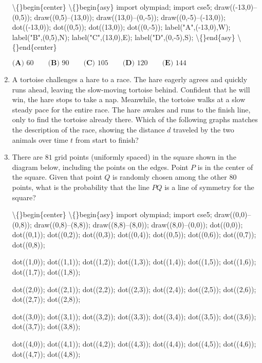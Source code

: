 \documentclass{article}
\begin{document}
\begin{enumerate}[label=\arabic*., itemsep=0.5em]
\textbackslash\{\}begin\{center\}
\textbackslash\{\}begin\{asy\}
import olympiad;
import cse5;
draw((-13,0)--(0,5));
draw((0,5)--(13,0));
draw((13,0)--(0,-5));
draw((0,-5)--(-13,0));
dot((-13,0));
dot((0,5));
dot((13,0));
dot((0,-5));
label("A",(-13,0),W);
label("B",(0,5),N);
label("C",(13,0),E);
label("D",(0,-5),S);
\textbackslash\{\}end\{asy\}
\textbackslash\{\}end\{center\}


\(\textbf{(A) }60\qquad\textbf{(B) }90\qquad\textbf{(C) }105\qquad\textbf{(D) }120\qquad\textbf{(E) }144\)\par \vspace{0.5em}\item A tortoise challenges a hare to a race. The hare eagerly agrees and quickly runs ahead, leaving the slow-moving tortoise behind. Confident that he will win, the hare stops to take a nap. Meanwhile, the tortoise walks at a slow steady pace for the entire race. The hare awakes and runs to the finish line, only to find the tortoise already there. Which of the following graphs matches the description of the race, showing the distance \(d\) traveled by the two animals over time \(t\) from start to finish?\par \vspace{0.5em}\item There are \(81\) grid points (uniformly spaced) in the square shown in the diagram below, including the points on the edges. Point \(P\) is in the center of the square. Given that point \(Q\) is randomly chosen among the other \(80\) points, what is the probability that the line \(PQ\) is a line of symmetry for the square?


\textbackslash\{\}begin\{center\}
\textbackslash\{\}begin\{asy\}
import olympiad;
import cse5;
draw((0,0)--(0,8));
draw((0,8)--(8,8));
draw((8,8)--(8,0));
draw((8,0)--(0,0));
dot((0,0));
dot((0,1));
dot((0,2));
dot((0,3));
dot((0,4));
dot((0,5));
dot((0,6));
dot((0,7));
dot((0,8));

dot((1,0));
dot((1,1));
dot((1,2));
dot((1,3));
dot((1,4));
dot((1,5));
dot((1,6));
dot((1,7));
dot((1,8));

dot((2,0));
dot((2,1));
dot((2,2));
dot((2,3));
dot((2,4));
dot((2,5));
dot((2,6));
dot((2,7));
dot((2,8));

dot((3,0));
dot((3,1));
dot((3,2));
dot((3,3));
dot((3,4));
dot((3,5));
dot((3,6));
dot((3,7));
dot((3,8));

dot((4,0));
dot((4,1));
dot((4,2));
dot((4,3));
dot((4,4));
dot((4,5));
dot((4,6));
dot((4,7));
dot((4,8));


\end{enumerate}
\end{document}
